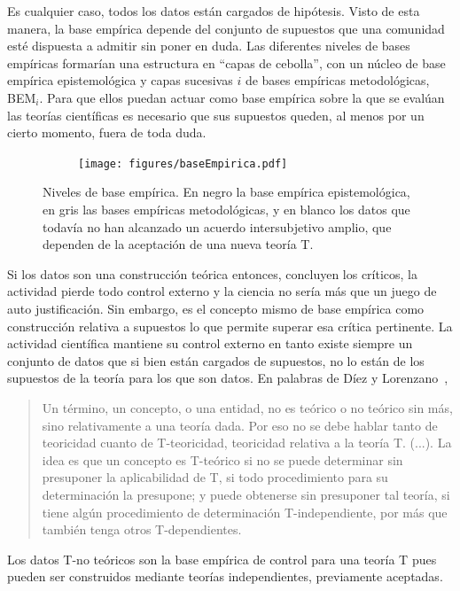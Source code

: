 \documentclass[a4paper,11pt]{book}
\theoremstyle{definition}
\begin{document}
Es cualquier caso, todos los datos est\'an cargados de hip\'otesis.
%
Visto de esta manera, la base emp\'irica depende del conjunto de supuestos que una comunidad esté dispuesta a admitir sin poner en duda.
%
Las diferentes niveles de bases emp\'iricas formar\'ian una estructura en ``capas de cebolla'', con un n\'ucleo de base emp\'irica epistemol\'ogica y capas sucesivas $i$ de bases emp\'iricas metodol\'ogicas, BEM$_i$.
%
Para que ellos puedan actuar como base emp\'irica sobre la que se eval\'uan las teor\'ias cient\'ificas es necesario que sus supuestos queden, al menos por un cierto momento, fuera de toda duda.
%
\begin{figure}[ht!]
    \centering
    \begin{subfigure}[b]{0.48\textwidth}
    \texttt{[image: figures/baseEmpirica.pdf]}
    \end{subfigure}
    \caption{Niveles de base emp\'irica. En negro la base emp\'irica epistemol\'ogica, en gris las bases emp\'iricas metodol\'ogicas, y en blanco los datos que todav\'ia no han alcanzado un acuerdo intersubjetivo amplio, que dependen de la aceptaci\'on de una nueva teor\'ia T. }
\end{figure}


Si los datos son una construcci\'on te\'orica entonces, concluyen los cr\'iticos, la actividad pierde todo control externo y la ciencia no ser\'ia más que un juego de auto justificaci\'on.
%
Sin embargo, es el concepto mismo de base emp\'irica como construcci\'on relativa a supuestos lo que permite superar esa cr\'itica pertinente.
%
La actividad cient\'ifica mantiene su control externo en tanto existe siempre un conjunto de datos que si bien están cargados de supuestos, no lo están de los supuestos de la teor\'ia para los que son datos.
%
En palabras de D\'iez y Lorenzano~\cite{lorenzano2002-concepcionEstructuralista},
%
\begin{quotation}
Un término, un concepto, o una entidad, no es te\'orico o no te\'orico sin más, sino relativamente a una teor\'ia dada.
Por eso no se debe hablar tanto de teoricidad cuanto de T-teoricidad, teoricidad relativa a la teor\'ia T. (...).
La idea es que un concepto es T-te\'orico si no se puede determinar sin presuponer la aplicabilidad de T, si todo procedimiento para su determinaci\'on la presupone; y puede obtenerse sin presuponer tal teor\'ia, si tiene alg\'un procedimiento de determinaci\'on T-independiente, por más que también tenga otros T-dependientes.
\end{quotation}
%
Los datos T-no te\'oricos son la base emp\'irica de control para una teor\'ia T pues pueden ser construidos mediante teor\'ias independientes, previamente aceptadas.
%
\end{document}
